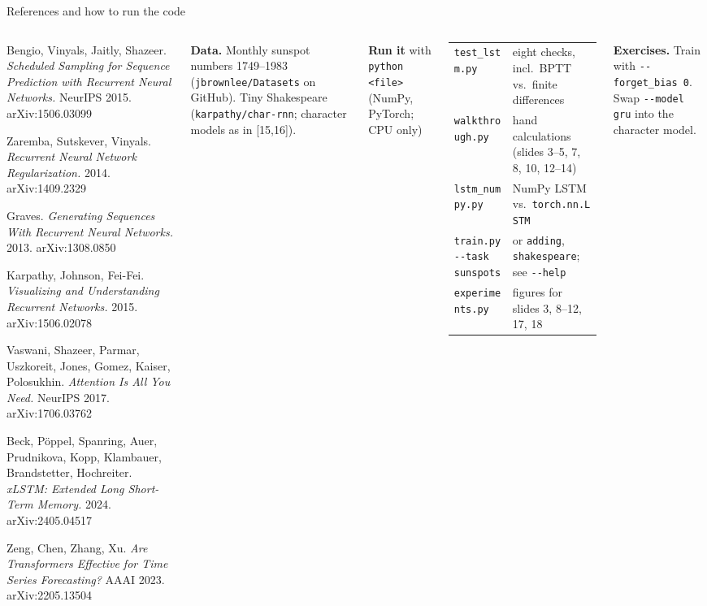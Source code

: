 \documentclass[aspectratio=169,10pt]{beamer}
\renewcommand{\cite}[1]{{\scriptsize\color{cTok}[#1]}}
\begin{document}
\begin{frame}{References and how to run the code}
\begin{columns}[T,onlytextwidth]
\begin{enumerate}[{[1]}]
\item Bengio, Vinyals, Jaitly, Shazeer. \emph{Scheduled Sampling for Sequence Prediction with Recurrent Neural Networks.} NeurIPS 2015. arXiv:1506.03099
\item Zaremba, Sutskever, Vinyals. \emph{Recurrent Neural Network Regularization.} 2014. arXiv:1409.2329
\item Graves. \emph{Generating Sequences With Recurrent Neural Networks.} 2013. arXiv:1308.0850
\item Karpathy, Johnson, Fei-Fei. \emph{Visualizing and Understanding Recurrent Networks.} 2015. arXiv:1506.02078
\item Vaswani, Shazeer, Parmar, Uszkoreit, Jones, Gomez, Kaiser, Polosukhin. \emph{Attention Is All You Need.} NeurIPS 2017. arXiv:1706.03762
\item Beck, P\"oppel, Spanring, Auer, Prudnikova, Kopp, Klambauer, Brandstetter, Hochreiter. \emph{xLSTM: Extended Long Short-Term Memory.} 2024. arXiv:2405.04517
\item Zeng, Chen, Zhang, Xu. \emph{Are Transformers Effective for Time Series Forecasting?} AAAI 2023. arXiv:2205.13504
\end{enumerate}
\vspace{0.3mm}
{\color{cInk}\textbf{Data.} Monthly sunspot numbers 1749--1983 (\texttt{jbrownlee/Datasets} on GitHub).
Tiny Shakespeare (\texttt{karpathy/char-rnn}; character models as in \cite{15,16}).}

\vspace{0.5mm}
{\fontsize{6.6}{8.1}\selectfont\color{cInk}
\textbf{Run it} with \texttt{python <file>} (NumPy, PyTorch; CPU only)

\vspace{0.5mm}
\begin{tabular}{@{}l@{\ \ }l@{}}
\texttt{test\_lstm.py} & eight checks, incl.\ BPTT vs.\ finite differences\\
\texttt{walkthrough.py} & hand calculations (slides 3--5, 7, 8, 10, 12--14)\\
\texttt{lstm\_numpy.py} & NumPy LSTM vs.\ \texttt{torch.nn.LSTM}\\
\texttt{train.py -{}-task sunspots} & or \texttt{adding}, \texttt{shakespeare}; see \texttt{-{}-help}\\
\texttt{experiments.py} & figures for slides 3, 8--12, 17, 18\\
\end{tabular}

\vspace{0.5mm}
\textbf{Exercises.} Train with \texttt{-{}-forget\_bias 0}. Swap \texttt{-{}-model gru} into the character model.}
\end{columns}
\end{frame}
\end{document}

